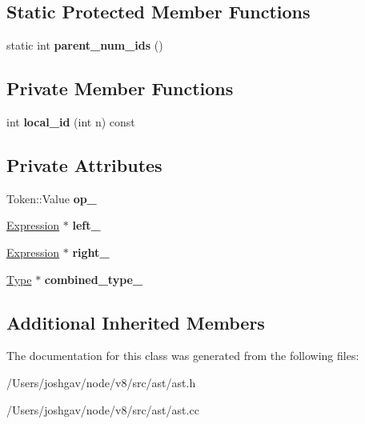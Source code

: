 \subsection*{Static Protected Member Functions}
\begin{DoxyCompactItemize}
\item 
static int {\bfseries parent\+\_\+num\+\_\+ids} ()\hypertarget{classv8_1_1internal_1_1_compare_operation_a9a2a78f5fa55dcbc0a9f69794d618091}{}\label{classv8_1_1internal_1_1_compare_operation_a9a2a78f5fa55dcbc0a9f69794d618091}

\end{DoxyCompactItemize}
\subsection*{Private Member Functions}
\begin{DoxyCompactItemize}
\item 
int {\bfseries local\+\_\+id} (int n) const \hypertarget{classv8_1_1internal_1_1_compare_operation_af2259a943be680e048810e0ccd1f4c77}{}\label{classv8_1_1internal_1_1_compare_operation_af2259a943be680e048810e0ccd1f4c77}

\end{DoxyCompactItemize}
\subsection*{Private Attributes}
\begin{DoxyCompactItemize}
\item 
Token\+::\+Value {\bfseries op\+\_\+}\hypertarget{classv8_1_1internal_1_1_compare_operation_ae1b6932e85ab91adfe811133a9af1924}{}\label{classv8_1_1internal_1_1_compare_operation_ae1b6932e85ab91adfe811133a9af1924}

\item 
\hyperlink{classv8_1_1internal_1_1_expression}{Expression} $\ast$ {\bfseries left\+\_\+}\hypertarget{classv8_1_1internal_1_1_compare_operation_ad7c549148d51f03f085c54ffb06868a0}{}\label{classv8_1_1internal_1_1_compare_operation_ad7c549148d51f03f085c54ffb06868a0}

\item 
\hyperlink{classv8_1_1internal_1_1_expression}{Expression} $\ast$ {\bfseries right\+\_\+}\hypertarget{classv8_1_1internal_1_1_compare_operation_a2adc066a89fa01e13fa0324dfc1b633c}{}\label{classv8_1_1internal_1_1_compare_operation_a2adc066a89fa01e13fa0324dfc1b633c}

\item 
\hyperlink{classv8_1_1internal_1_1_type}{Type} $\ast$ {\bfseries combined\+\_\+type\+\_\+}\hypertarget{classv8_1_1internal_1_1_compare_operation_a47e9e8239e893d791b2aa15a65dbdf2e}{}\label{classv8_1_1internal_1_1_compare_operation_a47e9e8239e893d791b2aa15a65dbdf2e}

\end{DoxyCompactItemize}
\subsection*{Additional Inherited Members}


The documentation for this class was generated from the following files\+:\begin{DoxyCompactItemize}
\item 
/\+Users/joshgav/node/v8/src/ast/ast.\+h\item 
/\+Users/joshgav/node/v8/src/ast/ast.\+cc\end{DoxyCompactItemize}

